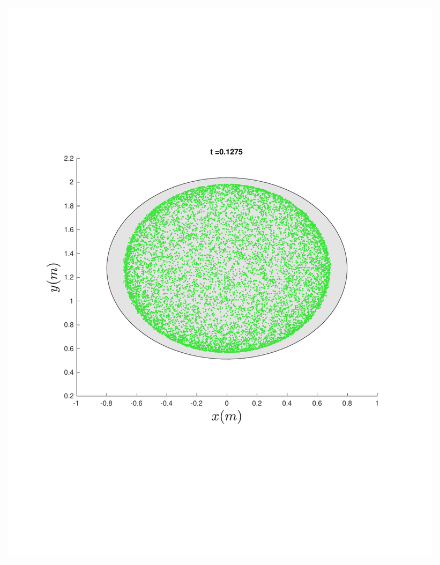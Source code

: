 \begin{figure}
{\begin{minipage}{0.5\textwidth}
\begin{minipage}[b]{0.5\textwidth}
        \includegraphics[width=\textwidth]{figures/method/FunnelSimOverlaid18funnel-1}
      \end{minipage}%
      \begin{minipage}[b]{0.5\textwidth}

\end{minipage}
\end{minipage}}
\end{figure}
